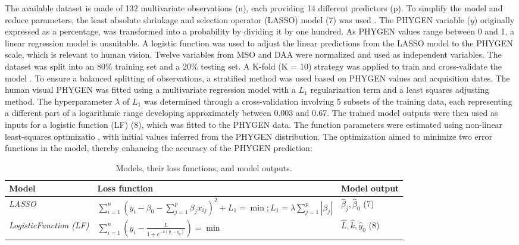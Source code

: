 \documentclass[12pt,a4paper,oneside]{report}
\begin{document}
The available dataset is made of 132 multivariate observations (n), each providing 14 different predictors (p). To simplify the model and reduce parameters, the least absolute shrinkage and selection operator (LASSO) model (7) was used 
\cite{hastieElementsStatisticalLearning2009}.
The PHYGEN variable ($y$) originally expressed as a percentage, was transformed into a probability by dividing it by one hundred. As PHYGEN values range between 0 and 1, a linear regression model is unsuitable. A logistic function was used to adjust the linear predictions from the LASSO model to the PHYGEN scale, which is relevant to human vision.
Twelve variables from MSO and DAA were normalized and used as independent variables. The dataset was split into an 80\% training set and a 20\% testing set. A K-fold (K = 10) strategy was applied to train and cross-validate the model
\cite{jamesIntroductionStatisticalLearning2023}.
To ensure a balanced splitting of observations, a stratified method was used based on PHYGEN values and acquisition dates. The human visual PHYGEN was fitted using a multivariate regression model with a 
$L_1$ regularization term \cite{friedmanRegularizationPathsGeneralized2010} and a least squares adjusting method.
The hyperparameter $\lambda$ of $L_1$ was determined through a cross-validation involving 5 subsets of the training data, each representing a different part of a logarithmic range developing approximately between 0.003 and 0.67. The trained model outputs were then used as inputs for a logistic function (LF) (8), which was fitted to the PHYGEN data. The function parameters were estimated using non-linear least-squares optimizatio
\cite{garbowMINPACK1SubroutineLibrary1984,stornDifferentialEvolutionSimple1997},
with initial values inferred from the PHYGEN distribution. The optimization aimed to minimize two error functions in the model, thereby enhancing the accuracy of the PHYGEN prediction:

\begin{table}[H]
    \centering
    \caption{Models, their loss functions, and model outputs.}
    \begin{tabularx}{\textwidth}{XXX}
    \toprule
    \textbf{Model} & \textbf{Loss function} & \textbf{Model output} \\
    \midrule
    \textit{LASSO} & $\sum_{i=1}^{n} \left( y_i - \beta_0 - \sum_{j=1}^{p} \beta_j x_{ij} \right)^2 + L_1 = \min; L_1 = \lambda \sum_{j=1}^{p} |\beta_j|$ & $\hat{\beta}_j, \hat{\beta}_0$ (7) \\
    \textit{LogisticFunction (LF)} & $\sum_{i=1}^{n} \left( y_i - \frac{L}{1 + e^{-k(\hat{y}_i - y_0)}} \right) = \min$ & $\hat{L}, \hat{k}, \hat{y}_0$ (8) \\
    \bottomrule
    \end{tabularx}
    \label{tab:models}
\end{table}
\end{document}
